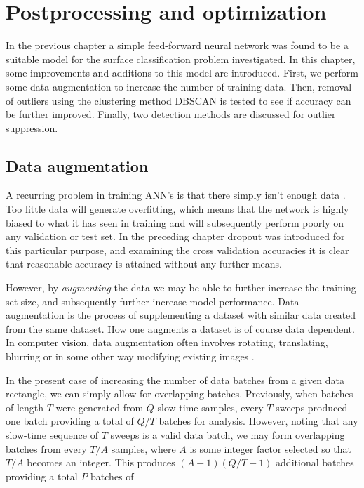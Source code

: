 \chapter{Postprocessing and optimization}

In the previous chapter a simple feed-forward neural network was found to be a suitable model for the surface classification problem investigated. In this chapter, some improvements and additions to this model are introduced. First, we perform some data augmentation to increase the number of training data. Then, removal of outliers using the clustering method DBSCAN is tested to see if accuracy can be further improved. Finally, two detection methods are discussed for outlier suppression.


\section{Data augmentation}

A recurring problem in training ANN's is that there simply isn't enough data \citep{lemley_bazrafkan_corcoran_2017}. Too little data will generate overfitting, which means that the network is highly biased to what it has seen in training and will subsequently perform poorly on any validation or test set. In the preceding chapter dropout was introduced for this particular purpose, and examining the cross validation accuracies it is clear that reasonable accuracy is attained without any further means.

However, by \emph{augmenting} the data we may be able to further increase the training set size, and subsequently further increase model performance. Data augmentation is the process of supplementing a dataset with similar data created from the same dataset. How one augments a dataset is of course data dependent. In computer vision, data augmentation often involves rotating, translating, blurring or in some other way modifying existing images \citep{lemley_bazrafkan_corcoran_2017}.

In the present case of increasing the number of data batches from a given data rectangle, we can simply allow for overlapping batches. Previously, when batches of length $T$ were generated from $Q$ slow time samples, every $T$ sweeps produced one batch providing a total of $Q/T$ batches for analysis. However, noting that any slow-time sequence of $T$ sweeps is a valid data batch, we may form overlapping batches from every $T/A$ samples, where $A$ is some integer factor selected so that $T/A$ becomes an integer. This produces $(A-1)(Q/T-1)$ additional batches providing a total $P$ batches of

